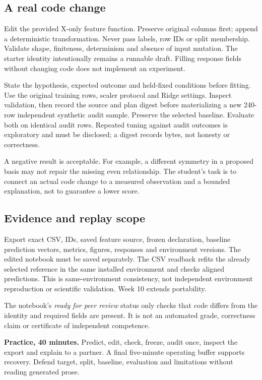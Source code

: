 \subsection{A real code change}
Edit the provided X-only feature function. Preserve original columns first; append a deterministic transformation. Never pass labels, row IDs or split membership. Validate shape, finiteness, determinism and absence of input mutation. The starter identity intentionally remains a runnable draft. Filling response fields without changing code does not implement an experiment.

State the hypothesis, expected outcome and held-fixed conditions before fitting. Use the original training rows, scaler protocol and Ridge settings. Inspect validation, then record the source and plan digest before materializing a new 240-row independent synthetic audit sample. Preserve the selected baseline. Evaluate both on identical audit rows. Repeated tuning against audit outcomes is exploratory and must be disclosed; a digest records bytes, not honesty or correctness.

A negative result is acceptable. For example, a different symmetry in a proposed basis may not repair the missing even relationship. The student's task is to connect an actual code change to a measured observation and a bounded explanation, not to guarantee a lower score.

\subsection{Evidence and replay scope}
Export exact CSV, IDs, saved feature source, frozen declaration, baseline prediction vectors, metrics, figures, responses and environment versions. The edited notebook must be saved separately. The CSV readback refits the already selected reference in the same installed environment and checks aligned predictions. This is same-environment consistency, not independent environment reproduction or scientific validation. Week 10 extends portability.

The notebook's \emph{ready for peer review} status only checks that code differs from the identity and required fields are present. It is not an automated grade, correctness claim or certificate of independent competence.

\textbf{Practice, 40 minutes.} Predict, edit, check, freeze, audit once, inspect the export and explain to a partner. A final five-minute operating buffer supports recovery. Defend target, split, baseline, evaluation and limitations without reading generated prose.

